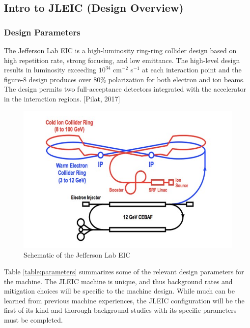 \subsection{Intro to JLEIC (Design Overview)}
\subsubsection{Design Parameters}
The Jefferson Lab EIC is a high-luminosity ring-ring collider design based on high repetition rate, strong focusing, and low emittance.  The high-level design results in luminosity exceeding $10^{34}$ cm$^{-2}$ s$^{-1}$ at each interaction point and the figure-8 design produces over 80\% polarization for both electron and ion beams.  The design permits two full-acceptance detectors integrated with the accelerator in the interaction regions.  [Pilat, 2017]

\begin{figure}
	\centering
	\includegraphics[width=.75\textwidth]{../../img/jleic_schematic.jpg}
	\caption{Schematic of the Jefferson Lab EIC}
	\label{fig:jleic1}
\end{figure}

Table \ref{table:parameters} summarizes some of the relevant design parameters for the machine.  The JLEIC machine is unique, and thus background rates and mitigation choices will be specific to the machine design.  While much can be learned from previous machine experiences, the JLEIC configuration will be the first of its kind and thorough background studies with its specific parameters must be completed.

